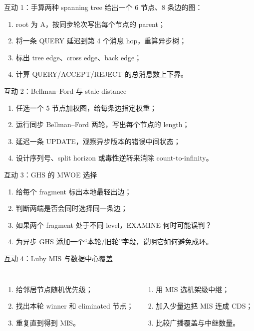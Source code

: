 \documentclass[UTF8,fontset=none,aspectratio=169,10pt]{beamer}
\begin{document}
{

\begin{frame}{互动 1：手算两种 spanning tree}
给出一个 6 节点、8 条边的图：
\begin{enumerate}
  \item root 为 A，按同步轮次写出每个节点的 parent；
  \item 将一条 QUERY 延迟到第 4 个消息 hop，重算异步树；
  \item 标出 tree edge、cross edge、back edge；
  \item 计算 QUERY/ACCEPT/REJECT 的总消息数上下界。
\end{enumerate}
\vfill
{}
\end{frame}

\begin{frame}{互动 2：Bellman--Ford 与 stale distance}
\begin{enumerate}
  \item 任选一个 5 节点加权图，给每条边指定权重；
  \item 运行同步 Bellman--Ford 两轮，写出每个节点的 length；
  \item 延迟一条 UPDATE，观察异步版本的错误中间状态；
  \item 设计序列号、split horizon 或毒性逆转来消除 count-to-infinity。
\end{enumerate}
\end{frame}

\begin{frame}{互动 3：GHS 的 MWOE 选择}
\begin{enumerate}
  \item 给每个 fragment 标出本地最轻出边；
  \item 判断两端是否会同时选择同一条边；
  \item 如果两个 fragment 处于不同 level，EXAMINE 何时可能误判？
  \item 为异步 GHS 添加一个“本轮/旧轮”字段，说明它如何避免成环。
\end{enumerate}
\end{frame}

\begin{frame}{互动 4：Luby MIS 与数据中心覆盖}
\begin{columns}[T,onlytextwidth]
\begin{enumerate}
  \item 给邻居节点随机优先级；
  \item 找出本轮 winner 和 eliminated 节点；
  \item 重复直到得到 MIS。
\end{enumerate}
\begin{enumerate}
  \item 用 MIS 选机架级中继；
  \item 加入少量边把 MIS 连成 CDS；
  \item 比较广播覆盖与中继数量。
\end{enumerate}
\end{columns}
\end{frame}

}
\end{document}
